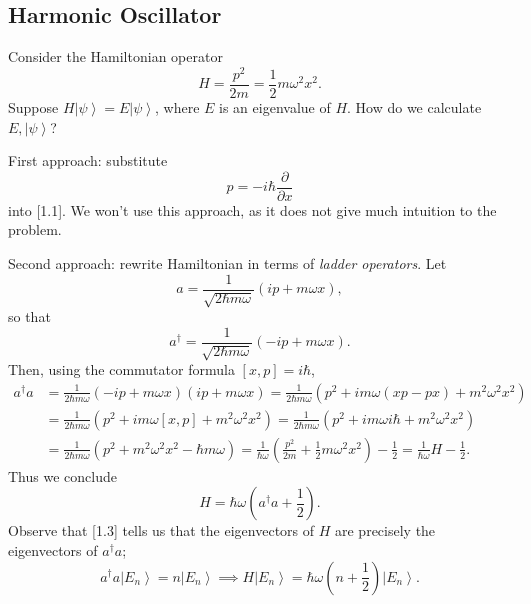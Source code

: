 \documentclass[phys334]{subfiles}
\begin{document}
    \rruleline

    \subsection{Harmonic Oscillator}

    \np Consider the Hamiltonian operator
    \begin{equation}
        H = \frac{p^{2}}{2m} = \frac{1}{2} m\omega^{2} x^{2}.
    \end{equation}
    Suppose $H\left| \psi \right\rangle = E\left| \psi \right\rangle$, where $E$ is an eigenvalue of $H$. How do we calculate $E,\left| \psi \right\rangle$?

    \np First approach: substitute
    \begin{equation}
        p = -i\hbar \frac{\partial}{\partial x}
    \end{equation}
    into [1.1]. We won't use this approach, as it does not give much intuition to the problem.

    \np Second approach: rewrite Hamiltonian in terms of \textit{ladder operators}. Let
    \begin{equation*}
        a = \frac{1}{\sqrt{2\hbar m\omega}} \left( ip + m\omega x \right),
    \end{equation*}
    so that
    \begin{equation*}
        a^{\dagger} = \frac{1}{\sqrt{2\hbar m\omega}}\left( -ip+m\omega x \right).
    \end{equation*}
    Then, using the commutator formula $\left[ x,p \right] = i\hbar$,
    \begin{equation*}
        \begin{aligned}
            a^{\dagger}a & = \frac{1}{2\hbar m\omega} \left( -ip+m\omega x \right)\left( ip+m\omega x \right) = \frac{1}{2\hbar m\omega} \left( p^{2}+im\omega\left( xp-px \right)+m^{2}\omega^{2}x^{2} \right) \\
                         & = \frac{1}{2\hbar m\omega} \left( p^{2}+im\omega\left[ x,p \right]+m^{2}\omega^{2}x^{2} \right) = \frac{1}{2\hbar m\omega} \left( p^{2}+im\omega i\hbar+m^{2}\omega^{2}x^{2} \right) \\
                         & = \frac{1}{2\hbar m\omega} \left( p^{2}+m^{2}\omega^{2}x^{2}-\hbar m\omega \right) = \frac{1}{\hbar\omega} \left( \frac{p^{2}}{2m} + \frac{1}{2} m\omega^{2}x^{2} \right) - \frac{1}{2} = \frac{1}{\hbar\omega} H - \frac{1}{2}.
        \end{aligned} 
    \end{equation*}
    Thus we conclude
    \begin{equation}
        H = \hbar\omega\left( a^{\dagger}a+\frac{1}{2} \right).
    \end{equation}
    Observe that [1.3] tells us that the eigenvectors of $H$ are precisely the eigenvectors of $a^{\dagger}a$; 
    \begin{equation*}
        a^{\dagger}a\left| E_n \right\rangle = n\left| E_n \right\rangle \implies H\left| E_n \right\rangle = \hbar\omega\left( n+\frac{1}{2} \right)\left| E_n \right\rangle.
    \end{equation*}
\end{document}
